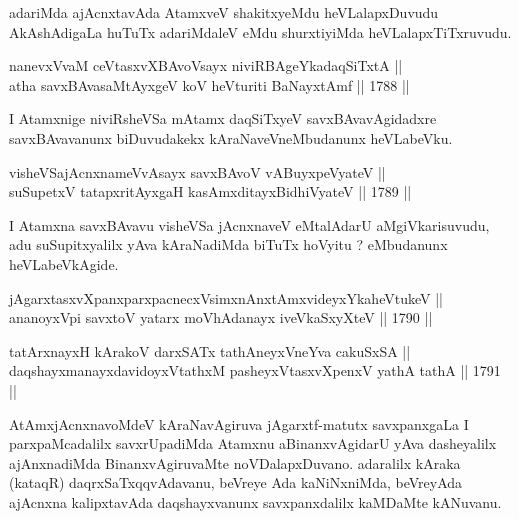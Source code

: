 \begin{artha}
adariMda ajAcnxtavAda AtamxveV shakitxyeMdu heVLalapxDuvudu
AkAshAdigaLa huTuTx adariMdaleV eMdu shurxtiyiMda heVLalapxTiTxruvudu.
\end{artha}



\begin{shl}
nanevxVvaM ceVtasxvXBAvoV\s sayx niviRBAgeYkadaqSiTxtA || \\
atha savxBAvasaMtAyxgeV koV heVturiti BaNayxtAmf \hfill || 1788 ||  
\end{shl}

\begin{artha}
I Atamxnige niviRsheVSa mAtamx daqSiTxyeV savxBAvavAgidadxre
savxBAvavanunx biDuvudakekx kAraNaveVneMbudanunx heVLabeVku.
\end{artha}

\begin{shl}
visheVSajAcnxnameVvAsayx savxBAvoV vA\s BuyxpeVyateV || \\
suSupetxV tatapxritAyxgaH kasAmxditayxBidhiVyateV \hfill || 1789 ||  
\end{shl}

\begin{artha}
I Atamxna savxBAvavu visheVSa jAcnxnaveV eMtalAdarU aMgiVkarisuvudu,
adu suSupitxyalilx yAva kAraNadiMda biTuTx hoVyitu ? eMbudanunx
heVLabeVkAgide.
\end{artha}


\begin{shl}
jAgarxtasxvXpanxparxpacnecxV\s simxnAnxtAmxvideyxYkaheVtukeV || \\
ananoyxV\s pi savxtoV yatarx moVhAdanayx iveVkaSxyXteV \hfill || 1790 ||  
\end{shl}

\begin{shl}
tatArxnayxH kArakoV darxSATx tathA\s neyxVneYva cakuSxSA || \\
daqshayxmanayxdavidoyxVtathxM pasheyxVtasxvXpenxV yathA tathA \hfill || 1791 ||  
\end{shl}

\begin{artha}
AtAmxjAcnxnavoMdeV kAraNavAgiruva jAgarxtf-matutx savxpanxgaLa I
parxpaMcadalilx savxrUpadiMda Atamxnu aBinanxvAgidarU yAva dasheyalilx
ajAnxnadiMda BinanxvAgiruvaMte noVDalapxDuvano. adaralilx kAraka
(kataqR) daqrxSaTxqqvAdavanu, beVreye Ada kaNiNxniMda, beVreyAda
ajAcnxna kalipxtavAda daqshayxvanunx savxpanxdalilx kaMDaMte kANuvanu.
\end{artha}

